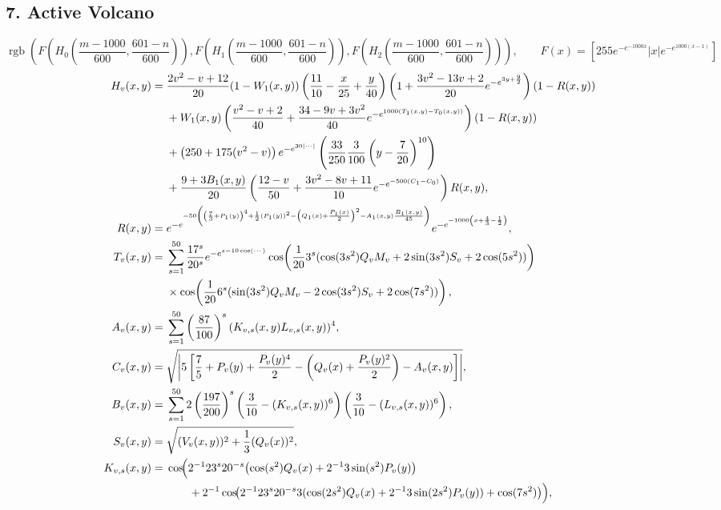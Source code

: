 \documentclass[10pt]{article}
\newcommand{\Fn}{F(x)=\left[255e^{-e^{-1000x}}|x|e^{-e^{1000(x-1)}}\right]}
\begin{document}
\begin{landscape}
\section*{7. Active Volcano}
\[
\operatorname{rgb}\!\left(
F\!\left(H_0\!\left(\frac{m-1000}{600},\frac{601-n}{600}\right)\right),
F\!\left(H_1\!\left(\frac{m-1000}{600},\frac{601-n}{600}\right)\right),
F\!\left(H_2\!\left(\frac{m-1000}{600},\frac{601-n}{600}\right)\right)
\right),\qquad \Fn
\]
\begin{align*}
H_v(x,y)={}&
\frac{2v^2-v+12}{20}(1-W_1(x,y))
\left(\frac{11}{10}-\frac{x}{25}+\frac y{40}\right)
\left(1+\frac{3v^2-13v+2}{20}e^{-e^{3y+\frac92}}\right)(1-R(x,y))
\\
&+W_1(x,y)
\left(
\frac{v^2-v+2}{40}
+\frac{34-9v+3v^2}{40}e^{-e^{1000(T_1(x,y)-T_0(x,y))}}
\right)(1-R(x,y))
\\
&+\left(250+175(v^2-v)\right)e^{-e^{30|\cdots|}}
\left(\frac{33}{250}\frac3{100}\left(y-\frac7{20}\right)^{10}\right)
\\
&+\frac{9+3B_1(x,y)}{20}
\left(
\frac{12-v}{50}
+\frac{3v^2-8v+11}{10}e^{-e^{-500(C_1-C_0)}}
\right)R(x,y),
\\
R(x,y)={}&
e^{-e^{-50\left(
\left(\frac73+P_1(y)\right)^4+\frac12(P_1(y))^2
-\left(Q_1(x)+\frac{P_1(x)}2\right)^2-A_1(x,y)\frac{B_1(x,y)}{45}
\right)}}
e^{-e^{-1000\left(x+\frac43-\frac12\right)}},
\\
T_v(x,y)={}&
\sum_{s=1}^{50}\frac{17^s}{20^s}
e^{-e^{s-10\cos(\cdots)}}
\cos\!\left(\frac{1}{20}3^s(\cos(3s^2)Q_vM_v+2\sin(3s^2)S_v+2\cos(5s^2))\right)
\\
&\times
\cos\!\left(\frac1{20}6^s(\sin(3s^2)Q_vM_v-2\cos(3s^2)S_v+2\cos(7s^2))\right),
\\
A_v(x,y)={}&\sum_{s=1}^{50}\left(\frac{87}{100}\right)^s(K_{v,s}(x,y)L_{v,s}(x,y))^4,
\\
C_v(x,y)={}&
\sqrt{\left|5\left[\frac75+P_v(y)+\frac{P_v(y)^4}{2}
-\left(Q_v(x)+\frac{P_v(y)^2}{2}\right)-A_v(x,y)\right]\right|},
\\
B_v(x,y)={}&
\sum_{s=1}^{50}2\left(\frac{197}{200}\right)^s
\left(\frac3{10}-(K_{v,s}(x,y))^6\right)
\left(\frac3{10}-(L_{v,s}(x,y))^6\right),
\\
S_v(x,y)={}&\sqrt{(V_v(x,y))^2+\frac13(Q_v(x))^2},
\\
K_{v,s}(x,y)={}&
\cos\!\Bigl(
2^{-1}23^s20^{-s}\bigl(\cos(s^2)Q_v(x)+2^{-1}3\sin(s^2)P_v(y)\bigr)
\\
&\qquad+2^{-1}\cos\!\bigl(2^{-1}23^s20^{-s}3(\cos(2s^2)Q_v(x)+2^{-1}3\sin(2s^2)P_v(y))+\cos(7s^2)\bigr)
\Bigr),
\\

\end{align*}
\end{landscape}
\end{document}
